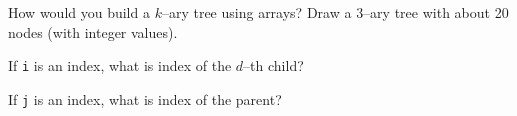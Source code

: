 How would you build a $k$--ary tree using 
arrays?
Draw a $3$--ary tree with about 20 nodes (with integer values).
\begin{tightlist}
  \item If \texttt{i} is an index, what is index of the $d$--th child?
  \item If \texttt{j} is an index, what is index of the parent?
\end{tightlist}
